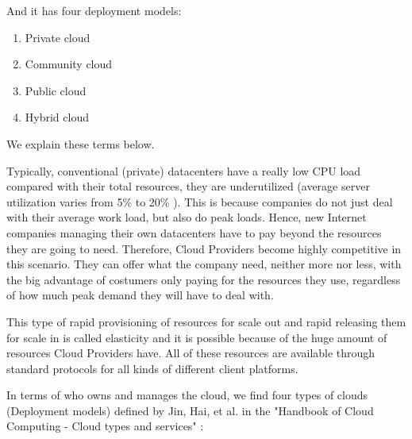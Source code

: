 And it has four deployment models: 
\begin{enumerate}
\item Private cloud
\item Community cloud
\item Public cloud
\item Hybrid cloud 
\end{enumerate}
We explain these terms below.
\par
Typically, conventional (private) datacenters have a really low CPU load compared with their total resources, they are underutilized (average server utilization varies from 5\% to 20\% \cite{lynch2008cloud}). This is because companies do not just deal with their average work load, but also do peak loads. Hence, new Internet companies managing their own datacenters have to pay beyond the resources they are going to need. Therefore, Cloud Providers become highly competitive in this scenario. They can offer what the company need, neither more nor less, with the big advantage of costumers only paying for the resources they use, regardless of how much peak demand they will have to deal with.
\par
This type of rapid provisioning of resources for scale out and rapid releasing them for scale in is called elasticity and it is possible because of the huge amount of resources Cloud Providers have. 
All of these resources are available through standard protocols for all kinds of different client platforms.
 \par
In terms of who owns and manages the cloud, we find four types of clouds (Deployment models) defined by Jin, Hai, et al. in the "Handbook of Cloud Computing - Cloud types and services" \cite{jin2010cloud}:
